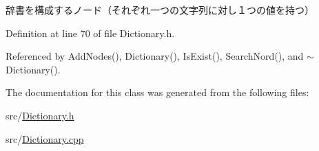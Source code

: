 辞書を構成するノード（それぞれ一つの文字列に対し１つの値を持つ） 



Definition at line 70 of file Dictionary.\-h.



Referenced by Add\-Nodes(), Dictionary(), Is\-Exist(), Search\-Nord(), and $\sim$\-Dictionary().



The documentation for this class was generated from the following files\-:\begin{DoxyCompactItemize}
\item 
src/\hyperlink{Dictionary_8h}{Dictionary.\-h}\item 
src/\hyperlink{Dictionary_8cpp}{Dictionary.\-cpp}\end{DoxyCompactItemize}
